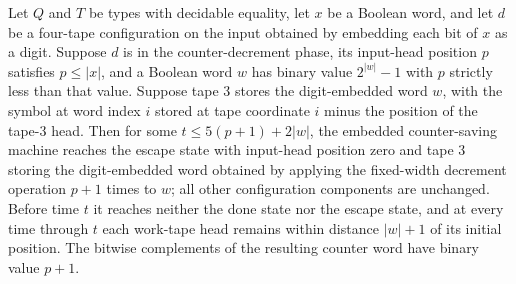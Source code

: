 \begin{theorem}
\label{Turing.recordStep_save_transport}
\leanok
{}
Let $Q$ and $T$ be types with decidable equality, let $x$ be a Boolean word, and let $d$
be a four-tape configuration on the input obtained by embedding each bit of $x$ as a
digit. Suppose $d$ is in the counter-decrement phase, its input-head position $p$
satisfies $p\le |x|$, and a Boolean word $w$ has binary value $2^{|w|}-1$ with $p$
strictly less than that value. Suppose tape 3 stores the digit-embedded word $w$, with
the symbol at word index $i$ stored at tape coordinate $i$ minus the position of the
tape-3 head. Then for some $t\le 5(p+1)+2|w|$, the embedded counter-saving machine
reaches the escape state with input-head position zero and tape 3 storing the
digit-embedded word obtained by applying the fixed-width decrement operation $p+1$ times
to $w$; all other configuration components are unchanged. Before time $t$ it reaches
neither the done state nor the escape state, and at every time through $t$ each
work-tape head remains within distance $|w|+1$ of its initial position. The bitwise
complements of the resulting counter word have binary value $p+1$.
\end{theorem}

